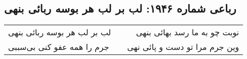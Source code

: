 \begin{center}
\section*{رباعی شماره ۱۹۴۶: لب بر لب هر بوسه ربائی بنهی}
\label{sec:1946}
\begin{longtable}{l p{0.5cm} r}
لب بر لب هر بوسه ربائی بنهی
&&
نوبت چو به ما رسد بهائی بنهی
\\
جرم را همه عفو کنی بی‌سببی
&&
وین جرم مرا تو دست و پائی نهی
\\
\end{longtable}
\end{center}
